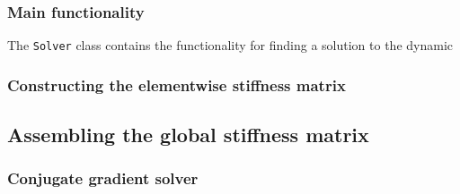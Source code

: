 \subsubsection{Main functionality}
The \texttt{Solver} class contains the functionality for finding a solution to the dynamic
\subsubsection{Constructing the elementwise stiffness matrix}
\subsection{Assembling the global stiffness matrix}
\subsubsection{Conjugate gradient solver}
